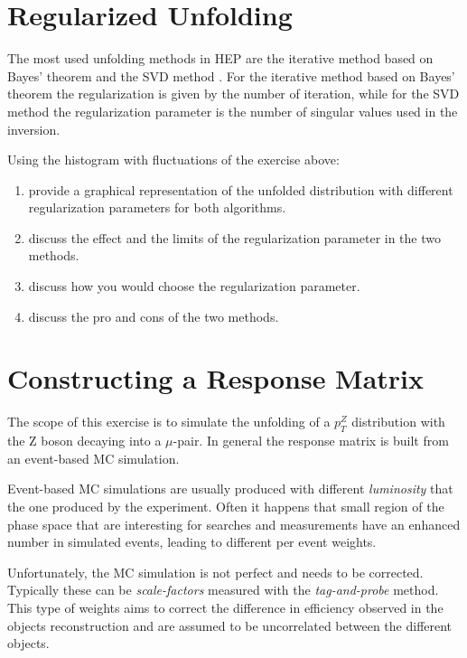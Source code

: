 \documentclass[a4paper,11pt]{article}
\begin{document}
\section{Regularized Unfolding}

The most used unfolding methods in \gls{HEP} are the iterative method based on Bayes' theorem \cite{dAgostini} and the \gls{SVD} method \cite{SVD}.
For the iterative method based on Bayes' theorem the regularization is given by the number of iteration, while for the \gls{SVD} method the regularization parameter is the number of singular values used in the inversion.

Using the histogram with fluctuations of the exercise above:
\begin{enumerate}
	\item provide a graphical representation of the unfolded distribution with different regularization parameters for both algorithms.
	\item discuss the effect and the limits of the regularization parameter in the two methods.
	\item discuss how you would choose the regularization parameter.
	\item discuss the pro and cons of the two methods.
\end{enumerate}

\section{Constructing a Response Matrix}

The scope of this exercise is to simulate the unfolding of a $p_{T}^{Z}$ distribution with the $\mathrm{Z}$ 
boson decaying into a $\mu$-pair.
In general the response matrix is built from an event-based \gls{MC} simulation.

Event-based \gls{MC} simulations
are usually produced with different \emph{luminosity} that the one produced by the experiment.
Often it happens that small region of the phase space that are interesting for searches and measurements have an enhanced number in simulated events, 
leading to different per event weights.

Unfortunately, the \gls{MC} simulation is not perfect and needs to be corrected.
Typically these can be \emph{scale-factors} measured with the \emph{tag-and-probe} method. 
This type of weights aims to correct the difference in efficiency observed in the objects reconstruction
and are assumed to be uncorrelated between the different objects.
\end{document}
